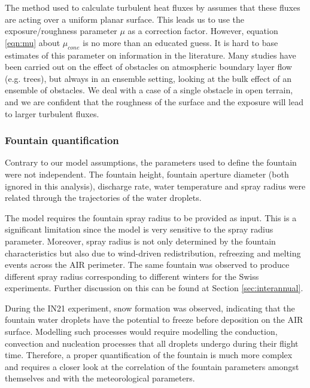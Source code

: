 
The method used to calculate turbulent heat fluxes by \citet{garrattAtmosphericBoundaryLayer1992} assumes that
these fluxes are acting over a uniform planar surface. This leads us to use the exposure/roughness parameter
$\mu$ as a correction factor. However, equation \ref{eqn:mu} about $\mu_{cone}$ is no more than an educated guess. It
is hard to base estimates of this parameter on information in the literature. Many studies have been carried out
on the effect of obstacles on atmospheric boundary layer flow (e.g. trees), but always in an ensemble setting,
looking at the bulk effect of an ensemble of obstacles. We deal with a case of a single obstacle in open
terrain, and we are confident that the roughness of the surface and the exposure will lead to larger turbulent
fluxes.

\subsubsection{Fountain quantification}

Contrary to our model assumptions, the parameters used to define the fountain were not independent. The fountain
height, fountain aperture diameter (both ignored in this analysis), discharge rate, water temperature and spray
radius were related through the trajectories of the water droplets.

The model requires the fountain spray radius to be provided as input. This is a significant limitation since the
model is very sensitive to the spray radius parameter. Moreover, spray radius is not only determined by the fountain
characteristics but also due to wind-driven redistribution, refreezing and melting events across the AIR
perimeter. The same fountain was observed to produce different spray radius corresponding to different winters
for the Swiss experiments. Further discussion on this can be found at Section \ref{sec:interannual}.


During the IN21 experiment, snow formation was observed, indicating that the fountain water droplets have the
potential to freeze before deposition on the AIR surface. Modelling such processes would require modelling the
conduction, convection and nucleation processes that all droplets undergo during their flight time. Therefore, a
proper quantification of the fountain is much more complex and requires a closer look at the correlation of the
fountain parameters amongst themselves and with the meteorological parameters.

